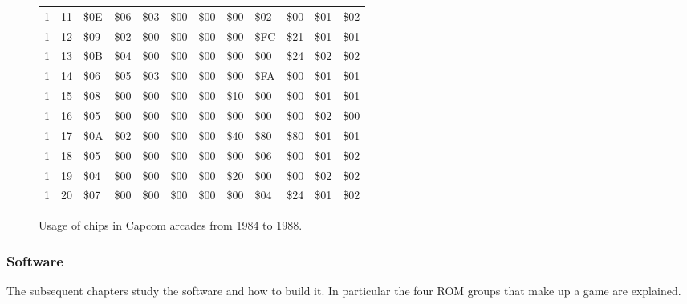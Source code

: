 {\begin{figure}[H]
{\begin{adjustbox}{width=\textwidth}
\begin{tabular}{rrllllllllll}
        1 &      11 & \$0E       & \$06       & \$03       & \$00       & \$00       & \$00       & \$02       & \$00       & \$01       & \$02       \\
        1 &      12 & \$09       & \$02       & \$00       & \$00       & \$00       & \$00       & \$FC       & \$21       & \$01       & \$01       \\
        1 &      13 & \$0B       & \$04       & \$00       & \$00       & \$00       & \$00       & \$00       & \$24       & \$02       & \$02       \\
        1 &      14 & \$06       & \$05       & \$03       & \$00       & \$00       & \$00       & \$FA       & \$00       & \$01       & \$01       \\
        1 &      15 & \$08       & \$00       & \$00       & \$00       & \$00       & \$10       & \$00       & \$00       & \$01       & \$01       \\
        1 &      16 & \$05       & \$00       & \$00       & \$00       & \$00       & \$00       & \$00       & \$00       & \$02       & \$00       \\
        1 &      17 & \$0A       & \$02       & \$00       & \$00       & \$00       & \$40       & \$80       & \$80       & \$01       & \$01       \\
        1 &      18 & \$05       & \$00       & \$00       & \$00       & \$00       & \$00       & \$06       & \$00       & \$01       & \$02       \\
        1 &      19 & \$04       & \$00       & \$00       & \$00       & \$00       & \$20       & \$00       & \$00       & \$02       & \$02       \\
        1 &      20 & \$07       & \$00       & \$00       & \$00       & \$00       & \$00       & \$04       & \$24       & \$01       & \$02       \\
\hline
\end{tabular}
  
\end{adjustbox}

  }\caption*{Usage of chips in Capcom arcades from 1984 to 1988\cite{cps0chipslist}.}
\label{fig:capcom_pcbs}
\end{figure}


\subsubsection{Software}
The subsequent chapters study the software and how to build it. In particular the four ROM groups that make up a game are explained. 

}
